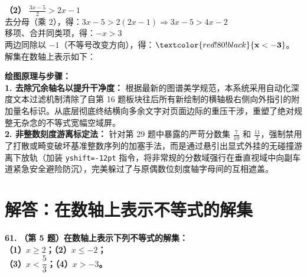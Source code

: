 \vspace{0.4cm}
\textbf{（2）} $\frac{3x-5}{2} > 2x - 1$ \\
去分母（乘 $2$），得：$3x - 5 > 2(2x - 1) \Rightarrow 3x - 5 > 4x - 2$ \\
移项、合并同类项，得：$-x > 3$ \\
两边同除以 $-1$（不等号改变方向），得：$\textcolor{red!80!black}{\mathbf{x < -3}}$。\\
解集在数轴上表示如下：
\begin{center}
\end{center}

\vspace{0.4cm}
{\small\color{blue!70!black}
\textbf{绘图原理与步骤：}\\
\textbf{1. 去除冗余轴名以提升干净度：} 根据最新的图谱美学规范，本系统采用自动化深度文本过滤机制清除了自第 16 题板块往后所有新绘制的横轴极右侧向外指引的附加量名标识。从底层彻底终结横向多余文字对页面边际的重压干涉，重塑了绝对规整无杂念的不等式宽幅空域屏。\\
\textbf{2. 非整数刻度游离标定法：} 针对第 29 题中暴露的严苛分数集 $\frac{7}{10}$ 和 $\frac{11}{2}$，强制禁用了打散或畸变破坏基准整数序列的加塞手法，而是通过悬引出显式外挂的无碰撞游离下放轨（加装 \texttt{yshift=-12pt} 指令，将非常规的分数域强行在垂直视域中向副车道紧急安全避险防沉），完美躲过了与原偶数位刻度轴字母间的互相遮盖。
}

\newpage



\section{解答：在数轴上表示不等式的解集}

\vspace{0.6cm}

\textbf{\LARGE 61.} \textbf{（第 5 题）在数轴上表示下列不等式的解集：\\
（1）$x \geqslant 2$；\qquad\quad （2）$x \leqslant -2$；\\
（3）$x < \dfrac{5}{3}$；\qquad\quad （4）$x > -3$。}

